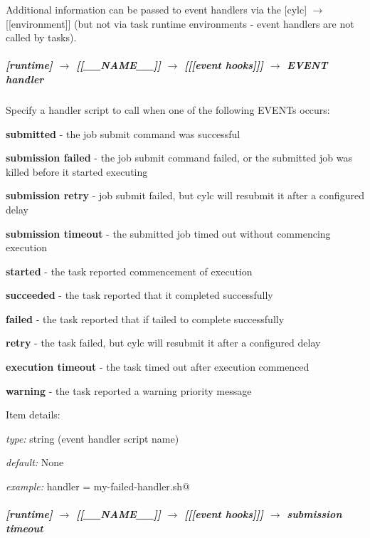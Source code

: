 Additional information can be passed to event handlers via the
[cylc] $\rightarrow$ [[environment]] (but not via task
runtime environments - event handlers are not called by tasks).

\subparagraph[EVENT handler]{[runtime] $\rightarrow$ [[\_\_NAME\_\_]] $\rightarrow$ [[[event hooks]]] $\rightarrow$ EVENT handler}

Specify a handler script to call when one of the following EVENTs occurs:
\begin{myitemize}
    \item {\bf submitted}      - the job submit command was successful
    \item {\bf submission failed}  - the job submit command failed, or the
                                   submitted job was killed before it started executing
    \item {\bf submission retry}   - job submit failed, but cylc will resubmit it
                                   after a configured delay
    \item {\bf submission timeout} - the submitted job timed out without commencing execution 

    \item {\bf started}        - the task reported commencement of execution
    \item {\bf succeeded}      - the task reported that it completed successfully
    \item {\bf failed}         - the task reported that if tailed to complete successfully
    \item {\bf retry}          - the task failed, but cylc will resubmit it
                                  after a configured delay
    \item {\bf execution timeout}        - the task timed out after execution commenced
    \item {\bf warning}        - the task reported a warning priority message
\end{myitemize}

Item details:
\begin{myitemize}
    \item {\em type:} string (event handler script name)
    \item {\em default:} None
    \item {\em example:} \lstinline@failed handler = my-failed-handler.sh@
\end{myitemize}

\subparagraph[submission timeout]{[runtime] $\rightarrow$ [[\_\_NAME\_\_]] $\rightarrow$ [[[event hooks]]] $\rightarrow$ submission timeout}

